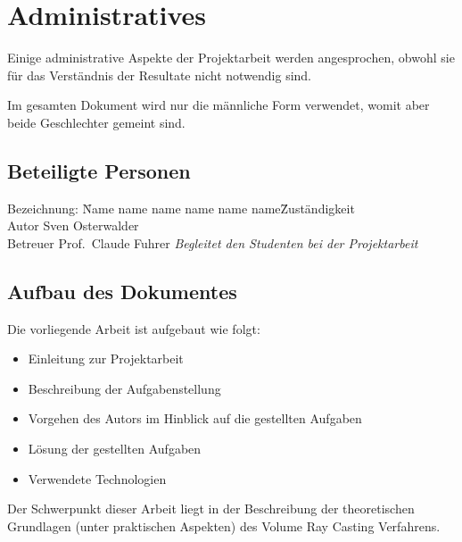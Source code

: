 
\chapter{Administratives}
\label{chap:20_administrative}

Einige administrative Aspekte der Projektarbeit werden angesprochen,
obwohl sie für das Verständnis der Resultate nicht notwendig sind.

Im gesamten Dokument wird nur die männliche Form verwendet, womit aber
beide Geschlechter gemeint sind.

\section{Beteiligte Personen}
\label{sec:involved_persons}

\begin{tabbing} %
Bezeichnung: \= Name name name name name name\= Zuständigkeit \kill \\
    Autor           \> Sven Osterwalder\protect\footnotemark[1]{}    \> \\
    Betreuer        \> Prof.\ Claude Fuhrer\protect\footnotemark[2]{}  \> \textit{Begleitet den Studenten bei der Projektarbeit}\\
\end{tabbing}

\section{Aufbau des Dokumentes}
\label{sec:document_structure}

Die vorliegende Arbeit ist aufgebaut wie folgt:
\begin{itemize}
    \item Einleitung zur Projektarbeit
    \item Beschreibung der Aufgabenstellung
    \item Vorgehen des Autors im Hinblick auf die gestellten Aufgaben
    \item Lösung der gestellten Aufgaben
    \item Verwendete Technologien
\end{itemize}

Der Schwerpunkt dieser Arbeit liegt in der Beschreibung der
theoretischen Grundlagen (unter praktischen Aspekten) des Volume Ray
Casting Verfahrens.

